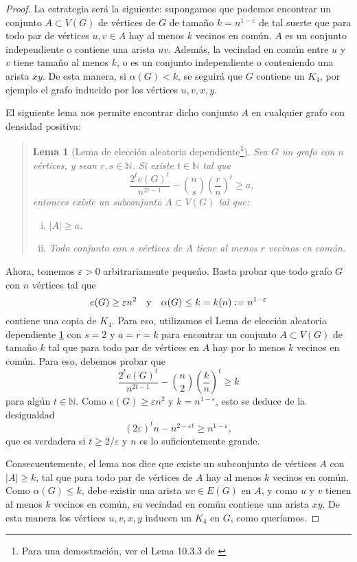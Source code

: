 \documentclass[12pt]{report}
\theoremstyle{plain}
\newtheorem{lemma}[theorem]{Lema}
\theoremstyle{definition}
\newcommand{\naturals}{\mathbb{N}}
\newcommand{\abs}[1]{\left \vert #1 \right \vert}
\begin{document}
\begin{proof}
La estrategia será la siguiente: supongamos que podemos encontrar un conjunto $A \subset V(G)$ de vértices de $G$ de tamaño $k = n^{1- \varepsilon}$ de tal suerte que para todo par de vértices $u,v \in A$ hay al menos $k$ vecinos en común. $A$ es un conjunto independiente o contiene una arista $uv$. Además, la vecindad en común entre $u$ y $v$ tiene tamaño al menos $k$, o es un conjunto independiente o conteniendo una arista $xy$. De esta manera, si $\alpha (G) < k$, se seguirá que $G$ contiene un $K_4$, por ejemplo el grafo inducido por los vértices $u,v,x,y$.

El siguiente lema nos permite encontrar dicho conjunto $A$ en cualquier grafo con densidad positiva:
\vspace{-20pt}
\begin{quote}
\begin{lemma}[Lema de elección aleatoria dependiente\footnote{
Para una demostración, ver el Lema 10.3.3 de \cite{botler2022combinatoria}
}]\label{lema:eleccion aleatoria dependiente}
Sea $G$ un grafo con $n$ vértices, y sean $r,s \in \naturals$. Si existe $t \in \naturals$ tal que
\[
    \frac{2^t e(G)^t}{n^{2t - 1}} - \binom n s \left ( \frac r n \right )^t \geq a,
\]
entonces existe un subconjunto $A \subset V(G)$ tal que:
\begin{enumerate}[(i)]
\item $\abs A \geq a$.
\item Todo conjunto con $s$ vértices de $A$ tiene al menos $r$ vecinos en común.
\end{enumerate}
\end{lemma}
\end{quote}

Ahora, tomemos $\varepsilon > 0$ arbitrariamente pequeño. Basta probar que todo grafo $G$ con $n$ vértices tal que
\[
    e(G) \geq \varepsilon n^2 \quad \text y \quad \alpha (G) \leq k = k(n) := n^{1- \varepsilon}
\]
contiene una copia de $K_4$. Para eso, utilizamos el Lema de elección aleatoria dependiente \ref{lema:eleccion aleatoria dependiente} con $s = 2$ y $a = r = k$ para encontrar un conjunto $A \subset V(G)$ de tamaño $k$ tal que para todo par de vértices en $A$ hay por lo menos $k$ vecinos en común. Para eso, debemos probar que
\[
    \frac{2^t e(G)^t}{n^{2t-1}} - \binom n 2 \left ( \frac k n \right )^t \geq k
\]
para algún $t \in \naturals$. Como $e(G) \geq \varepsilon n^2$ y $k = n^{1-\varepsilon}$, esto se deduce de la desigualdad
\[
    (2\varepsilon)^t n - n^{2 - \varepsilon t} \geq n^{1-\varepsilon},
\]
que es verdadera si $t \geq 2 / \varepsilon$ y $n$ es lo suficientemente grande.

Consecuentemente, el lema nos dice que existe un subconjunto de vértices $A$ con $\abs A \geq k$, tal que para todo par de vértices de $A$ hay al menos $k$ vecinos en común. Como $\alpha (G) \leq k$, debe existir una arista $uv \in E(G)$ en $A$, y como $u$ y $v$ tienen al menos $k$ vecinos en común, su vecindad en común contiene una arista $xy$. De esta manera los vértices $u,v,x,y$ inducen un $K_4$ en $G$, como queríamos.
\end{proof}
\end{document}
